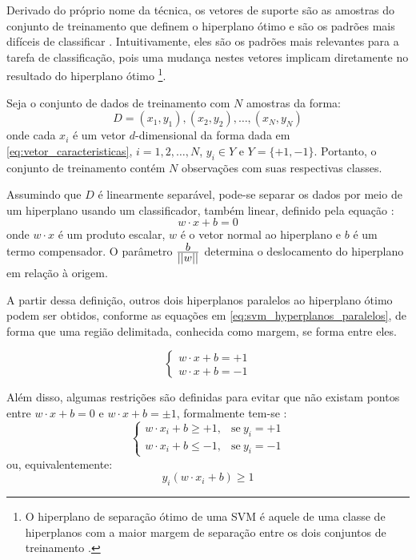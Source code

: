 Derivado do próprio nome da técnica, os vetores de suporte são as amostras do conjunto de treinamento que definem o hiperplano ótimo e são os padrões mais difíceis de classificar \citep{duda:12}. Intuitivamente, eles são os padrões mais relevantes para a tarefa de classificação, pois uma mudança nestes vetores implicam diretamente no resultado do hiperplano ótimo \footnote{O hiperplano de separação ótimo de uma SVM é aquele de uma classe de hiperplanos com a maior margem de separação entre os dois conjuntos de treinamento \citep{cortes:95}.}.

Seja o conjunto de dados de treinamento com $N$ amostras da forma:
\begin{equation}
\label{eq:svm_dataset}
    D = (x_1, y_1), (x_2, y_2), \ldots, (x_N, y_N)
\end{equation}
\noindent onde cada $x_i$ é um vetor $d$-dimensional da forma dada em \ref{eq:vetor_caracteristicas}, $i = 1, 2, \ldots, N$, $y_i \in Y$ e $Y = \{+1, -1\}$. Portanto, o conjunto de treinamento contém $N$ observações com suas respectivas classes.

Assumindo que $D$ é linearmente separável, pode-se separar os dados por meio de um hiperplano usando um classificador, também linear, definido pela equação \citep{lorena:03}:
\begin{equation}
\label{eq:svm_hyperplano_otimo}
w \cdot x + b = 0
\end{equation}
\noindent onde $w \cdot x$ é um produto escalar, $w$ é o vetor normal ao hiperplano e $b$ é um termo compensador. O parâmetro $\frac{\displaystyle b}{\displaystyle ||w||}$ determina o deslocamento do hiperplano em relação à origem.

A partir dessa definição, outros dois hiperplanos paralelos ao hiperplano ótimo podem ser obtidos, conforme as equações em \ref{eq:svm_hyperplanos_paralelos}, de forma que uma região delimitada, conhecida como margem, se forma entre eles.

\begin{equation}
\label{eq:svm_hyperplanos_paralelos}
\begin{cases}
    w \cdot x + b = +1\\
    w \cdot x + b = -1
\end{cases}
\end{equation}

Além disso, algumas restrições são definidas para evitar que não existam pontos entre $w \cdot x + b = 0$ e $w \cdot x + b = \pm 1$, formalmente tem-se \citep{lorena:03}:
\begin{equation}
\label{eq:svm_hyperplanos_paralelos_restricoes}
\begin{cases}
    w \cdot x_i + b \geq +1, & \text{se}\ y_i = +1\\
    w \cdot x_i + b \leq -1, & \text{se}\ y_i = -1
\end{cases}
\end{equation}
\noindent ou, equivalentemente:
\begin{equation}
\label{eq:svm_hyperplanos_paralelos_restricoes_equiv}
    y_i (w \cdot x_i + b) \geq 1
\end{equation}

